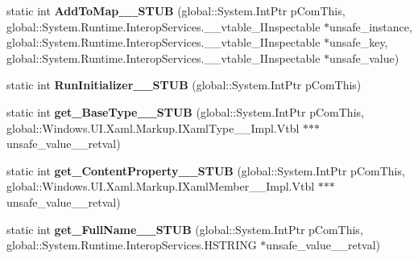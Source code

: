 \begin{DoxyCompactItemize}
static int {\bfseries Add\+To\+Map\+\_\+\+\_\+\+S\+T\+UB} (global\+::\+System.\+Int\+Ptr p\+Com\+This, global\+::\+System.\+Runtime.\+Interop\+Services.\+\_\+\+\_\+vtable\+\_\+\+I\+Inspectable $\ast$unsafe\+\_\+instance, global\+::\+System.\+Runtime.\+Interop\+Services.\+\_\+\+\_\+vtable\+\_\+\+I\+Inspectable $\ast$unsafe\+\_\+key, global\+::\+System.\+Runtime.\+Interop\+Services.\+\_\+\+\_\+vtable\+\_\+\+I\+Inspectable $\ast$unsafe\+\_\+value)
\item 
\mbox{\label{struct_windows_1_1_u_i_1_1_xaml_1_1_markup_1_1_i_xaml_type_____impl_1_1_vtbl_ad5c8dc426912e9b86124c65fc89447ce}} 
static int {\bfseries Run\+Initializer\+\_\+\+\_\+\+S\+T\+UB} (global\+::\+System.\+Int\+Ptr p\+Com\+This)
\item 
\mbox{\label{struct_windows_1_1_u_i_1_1_xaml_1_1_markup_1_1_i_xaml_type_____impl_1_1_vtbl_a3eabbdc6edd7e60a98ca2e1f1da8965c}} 
static int {\bfseries get\+\_\+\+Base\+Type\+\_\+\+\_\+\+S\+T\+UB} (global\+::\+System.\+Int\+Ptr p\+Com\+This, global\+::\+Windows.\+U\+I.\+Xaml.\+Markup.\+I\+Xaml\+Type\+\_\+\+\_\+\+Impl.\+Vtbl $\ast$$\ast$$\ast$unsafe\+\_\+value\+\_\+\+\_\+retval)
\item 
\mbox{\label{struct_windows_1_1_u_i_1_1_xaml_1_1_markup_1_1_i_xaml_type_____impl_1_1_vtbl_ada750449c85f0ee2addc461396c3694e}} 
static int {\bfseries get\+\_\+\+Content\+Property\+\_\+\+\_\+\+S\+T\+UB} (global\+::\+System.\+Int\+Ptr p\+Com\+This, global\+::\+Windows.\+U\+I.\+Xaml.\+Markup.\+I\+Xaml\+Member\+\_\+\+\_\+\+Impl.\+Vtbl $\ast$$\ast$$\ast$unsafe\+\_\+value\+\_\+\+\_\+retval)
\item 
\mbox{\label{struct_windows_1_1_u_i_1_1_xaml_1_1_markup_1_1_i_xaml_type_____impl_1_1_vtbl_a2968dc9d0e625f5da74b55b8a6c8179e}} 
static int {\bfseries get\+\_\+\+Full\+Name\+\_\+\+\_\+\+S\+T\+UB} (global\+::\+System.\+Int\+Ptr p\+Com\+This, global\+::\+System.\+Runtime.\+Interop\+Services.\+H\+S\+T\+R\+I\+NG $\ast$unsafe\+\_\+value\+\_\+\+\_\+retval)
\item 
\mbox{\label{struct_windows_1_1_u_i_1_1_xaml_1_1_markup_1_1_i_xaml_type_____impl_1_1_vtbl_ab8219cd3b1d3d3c3f585a6b8b8bfc195}} 

\end{DoxyCompactItemize}
